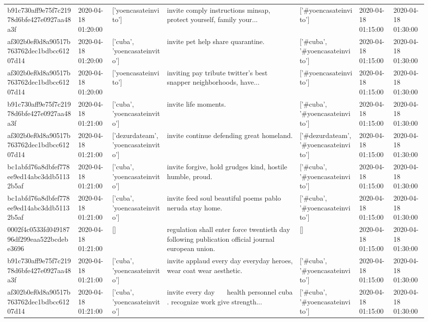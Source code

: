 \begin{tabular}{lllllll}
b91c730aff9e75f7c21978d6bfe427e0927aa48a3f & 2020-04-18 01:20:00 & ['yoencasateinvito'] & invite comply instructions minsap, protect yourself, family your... & ['#yoencasateinvito'] & 2020-04-18 01:15:00 & 2020-04-18 01:30:00 \\
af302b0ef0d8a90517b763762dec1bdbcc61207d14 & 2020-04-18 01:20:00 & ['cuba', 'yoencasateinvito'] & invite pet help share quarantine. & ['#cuba', '#yoencasateinvito'] & 2020-04-18 01:15:00 & 2020-04-18 01:30:00 \\
af302b0ef0d8a90517b763762dec1bdbcc61207d14 & 2020-04-18 01:20:00 & ['yoencasateinvito'] & inviting pay tribute twitter's best snapper neighborhoods, have... & ['#yoencasateinvito'] & 2020-04-18 01:15:00 & 2020-04-18 01:30:00 \\
b91c730aff9e75f7c21978d6bfe427e0927aa48a3f & 2020-04-18 01:21:00 & ['cuba', 'yoencasateinvito'] & invite life moments. & ['#cuba', '#yoencasateinvito'] & 2020-04-18 01:15:00 & 2020-04-18 01:30:00 \\
af302b0ef0d8a90517b763762dec1bdbcc61207d14 & 2020-04-18 01:21:00 & ['dezurdateam', 'yoencasateinvito'] & invite continue defending great homeland. & ['#dezurdateam', '#yoencasateinvito'] & 2020-04-18 01:15:00 & 2020-04-18 01:30:00 \\
bc1abfd76a8dbfef778ee9ed14abc3ddb51132b5af & 2020-04-18 01:21:00 & ['cuba', 'yoencasateinvito'] & invite forgive, hold grudges kind, hostile humble, proud. & ['#cuba', '#yoencasateinvito'] & 2020-04-18 01:15:00 & 2020-04-18 01:30:00 \\
bc1abfd76a8dbfef778ee9ed14abc3ddb51132b5af & 2020-04-18 01:21:00 & ['cuba', 'yoencasateinvito'] & invite feed soul beautiful poems pablo neruda stay home. & ['#cuba', '#yoencasateinvito'] & 2020-04-18 01:15:00 & 2020-04-18 01:30:00 \\
0002f4c0533fd04918796df299eaa522bcdebe3696 & 2020-04-18 01:21:00 & [] & regulation shall enter force twentieth day following publication official journal european union. & [] & 2020-04-18 01:15:00 & 2020-04-18 01:30:00 \\
b91c730aff9e75f7c21978d6bfe427e0927aa48a3f & 2020-04-18 01:21:00 & ['cuba', 'yoencasateinvito'] & invite applaud every day everyday heroes, wear coat wear aesthetic. & ['#cuba', '#yoencasateinvito'] & 2020-04-18 01:15:00 & 2020-04-18 01:30:00 \\
af302b0ef0d8a90517b763762dec1bdbcc61207d14 & 2020-04-18 01:21:00 & ['cuba', 'yoencasateinvito'] & invite every day 👏👏👏👏 health personnel cuba ️. recognize work give strength... & ['#cuba', '#yoencasateinvito'] & 2020-04-18 01:15:00 & 2020-04-18 01:30:00 \\

\end{tabular}
